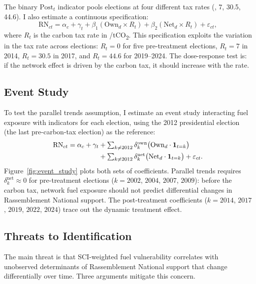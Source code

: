 \documentclass[12pt]{article}
\providecommand{\euro}{\texteuro}
\newcommand{\rn}{Rassemblement National}
\begin{document}
The binary $\text{Post}_t$ indicator pools elections at four different tax rates (\euro 0, 7, 30.5, 44.6). I also estimate a continuous specification:
\begin{equation}
\text{RN}_{ct} = \alpha_c + \gamma_t + \beta_1 (\text{Own}_d \times R_t) + \beta_2 (\text{Net}_d \times R_t) + \varepsilon_{ct},
\label{eq:continuous}
\end{equation}
where $R_t$ is the carbon tax rate in \euro/tCO\textsubscript{2}. This specification exploits the variation in the tax rate across elections: $R_t = 0$ for five pre-treatment elections, $R_t = 7$ in 2014, $R_t = 30.5$ in 2017, and $R_t = 44.6$ for 2019--2024. The dose-response test is: if the network effect is driven by the carbon tax, it should increase with the rate.

\subsection{Event Study}

To test the parallel trends assumption, I estimate an event study interacting fuel exposure with indicators for each election, using the 2012 presidential election (the last pre-carbon-tax election) as the reference:
\begin{align}
\text{RN}_{ct} = \alpha_c + \gamma_t &+ \textstyle\sum_{k \neq 2012} \delta^{\text{own}}_k \bigl(\text{Own}_d \cdot \mathbf{1}_{t=k}\bigr) \notag \\
&+ \textstyle\sum_{k \neq 2012} \delta^{\text{net}}_k \bigl(\text{Net}_d \cdot \mathbf{1}_{t=k}\bigr) + \varepsilon_{ct}.
\label{eq:event_study}
\end{align}
Figure~\ref{fig:event_study} plots both sets of coefficients. Parallel trends requires $\delta^{\text{net}}_k \approx 0$ for pre-treatment elections ($k = 2002$, $2004$, $2007$, $2009$): before the carbon tax, network fuel exposure should not predict differential changes in \rn{} support. The post-treatment coefficients ($k = 2014$, $2017$, $2019$, $2022$, $2024$) trace out the dynamic treatment effect.

\subsection{Threats to Identification}

The main threat is that SCI-weighted fuel vulnerability correlates with unobserved determinants of \rn{} support that change differentially over time. Three arguments mitigate this concern.
\end{document}
